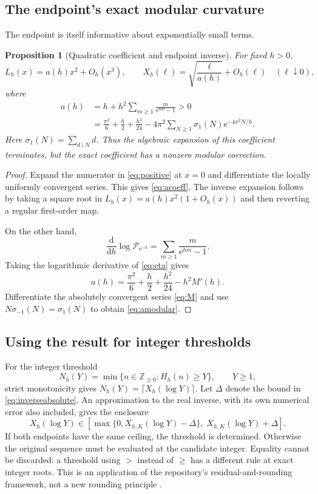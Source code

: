 \documentclass[11pt,a4paper]{article}
\numberwithin{equation}{section}
\newtheorem{proposition}[theorem]{Proposition}
\theoremstyle{definition}
\newcommand{\Z}{\mathbb Z}
\newcommand{\ee}{\mathrm e}
\newcommand{\Pq}{\mathcal P}
\begin{document}
\subsection{The endpoint's exact modular curvature}
The endpoint is itself informative about exponentially small terms.

\begin{proposition}[Quadratic coefficient and endpoint inverse]
\label{prop:endpoint}
For fixed $h>0$,
\begin{equation}
L_h(x)=a(h)x^2+O_h(x^3),\qquad
X_h(\ell)=\sqrt{\frac{\ell}{a(h)}}+O_h(\ell)
\quad(\ell\downarrow0),
\label{eq:endpointinverse}
\end{equation}
where
\begin{align}
a(h)&=h+h^2\sum_{m\ge1}\frac{m}{\ee^{hm}-1}>0\label{eq:acoeff}\\
&=\frac{\pi^2}{6}+\frac h2+\frac{h^2}{24}
 -4\pi^2\sum_{N\ge1}\sigma_1(N)\ee^{-4\pi^2N/h}.
\label{eq:amodular}
\end{align}
Here $\sigma_1(N)=\sum_{d\mid N}d$. Thus the algebraic expansion of this coefficient terminates, but the exact coefficient has a nonzero modular correction.
\end{proposition}
\begin{proof}
Expand the numerator in \eqref{eq:positive} at $x=0$ and differentiate the locally uniformly convergent series. This gives \eqref{eq:acoeff}. The inverse expansion follows by taking a square root in $L_h(x)=a(h)x^2(1+O_h(x))$ and then reverting a regular first-order map.

On the other hand,
\[
\frac{\mathrm d}{\mathrm dh}\log\Pq_{\ee^{-h}}
=\sum_{m\ge1}\frac{m}{\ee^{hm}-1}.
\]
Taking the logarithmic derivative of \eqref{eq:eta} gives
\[
a(h)=\frac{\pi^2}{6}+\frac h2+\frac{h^2}{24}-h^2M'(h).
\]
Differentiate the absolutely convergent series \eqref{eq:M} and use $N\sigma_{-1}(N)=\sigma_1(N)$ to obtain \eqref{eq:amodular}.
\end{proof}

\subsection{Using the result for integer thresholds}
For the integer threshold
\[
N_h(Y)=\min\{n\in\Z_{\ge0}:H_h(n)\ge Y\},\qquad Y\ge1,
\]
strict monotonicity gives $N_h(Y)=\lceil X_h(\log Y)\rceil$. Let $\Delta$ denote the bound in \eqref{eq:inverseabsolute}. An approximation to the real inverse, with its own numerical error also included, gives the enclosure
\[
X_h(\log Y)\in
[\max\{0,X_{h,K}(\log Y)-\Delta\},\;X_{h,K}(\log Y)+\Delta].
\]
If both endpoints have the same ceiling, the threshold is determined. Otherwise the original sequence must be evaluated at the candidate integer. Equality cannot be discarded: a threshold using $>$ instead of $\ge$ has a different rule at exact integer roots. This is an application of the repository's residual-and-rounding framework, not a new rounding principle \cite{reporeadme}.
\end{document}
